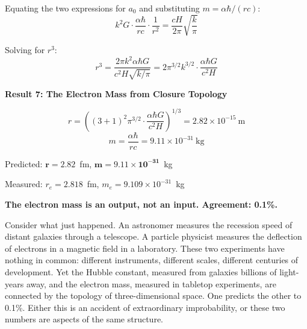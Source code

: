 \documentclass[aps,prd,preprint,superscriptaddress,showpacs,preprintnumbers,amsmath,amssymb,nofootinbib]{revtex4-2}
\begin{document}
Equating the two expressions for $a_0$ and substituting $m = \alpha\hbar/(rc)$:
\begin{equation}
k^2 G \cdot \frac{\alpha\hbar}{rc} \cdot \frac{1}{r^2} = \frac{cH}{2\pi} \sqrt{\frac{k}{\pi}}
\end{equation}

Solving for $r^3$:
\begin{equation}
r^3 = \frac{2\pi k^2 \alpha \hbar G}{c^2 H \sqrt{k/\pi}} = 2\pi^{3/2} k^{3/2} \cdot \frac{\alpha \hbar G}{c^2 H}
\end{equation}

\vspace{1.5em}
\noindent
\colorbox{resultgreen}{\parbox{\dimexpr\textwidth-2\fboxsep\relax}{%
\vspace{0.8em}
\centering
\textbf{\large Result 7: The Electron Mass from Closure Topology}

\vspace{0.5em}
\boldmath
\begin{equation}
r = \left( (3{+}1)^2 \pi^{3/2} \cdot \frac{\alpha \hbar G}{c^2 H} \right)^{1/3} = 2.82 \times 10^{-15}~\text{m}
\end{equation}
\begin{equation}
m = \frac{\alpha \hbar}{rc} = 9.11 \times 10^{-31}~\text{kg}
\end{equation}
\unboldmath

\vspace{0.3em}
Predicted: $\bm{r = 2.82}$~fm, $\bm{m = 9.11 \times 10^{-31}}$~kg

Measured: $r_e = 2.818$~fm, $m_e = 9.109 \times 10^{-31}$~kg

\textbf{The electron mass is an output, not an input. Agreement: 0.1\%.}
\vspace{0.5em}
}}
\vspace{1cm}

Consider what just happened. An astronomer measures the recession speed of distant galaxies through a telescope. A particle physicist measures the deflection of electrons in a magnetic field in a laboratory. These two experiments have nothing in common: different instruments, different scales, different centuries of development. Yet the Hubble constant, measured from galaxies billions of light-years away, and the electron mass, measured in tabletop experiments, are connected by the topology of three-dimensional space. One predicts the other to 0.1\%. Either this is an accident of extraordinary improbability, or these two numbers are aspects of the same structure.
\end{document}
